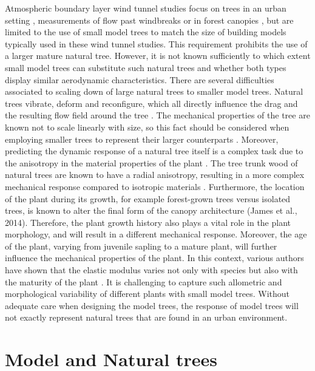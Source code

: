 Atmospheric boundary layer wind tunnel studies focus on trees in an urban setting \citep{Gromke2011,Gromke2008a}, measurements of flow past windbreaks \citep{Guan2003} or in forest canopies \citep{Bai2013,Conan2015,Kinnersley1994}, but are limited to the use of small model trees to match the size of building models typically used in these wind tunnel studies. This requirement prohibits the use of a larger mature natural tree. However, it is not known sufficiently to which extent small model trees can substitute such natural trees and whether both types display similar aerodynamic characteristics. There are several difficulties associated to scaling down of large natural trees to smaller model trees. Natural trees vibrate, deform and reconfigure, which all directly influence the drag and the resulting flow field around the tree \citep{Schouveiler2006,Tadrist2014,Vogel1989}. The mechanical properties of the tree are known not to scale linearly with size, so this fact should be considered when employing smaller trees to represent their larger counterparts \citep{DeLangre2008}. Moreover, predicting the dynamic response of a natural tree itself is a complex task due to the anisotropy in the material properties of the plant \citep{James2017}. The tree trunk wood of natural trees are known to have a radial anisotropy, resulting in a more complex mechanical response compared to isotropic materials \citep{Albrecht2016}. Furthermore, the location of the plant during its growth, for example forest-grown trees versus isolated trees, is known to alter the final form of the canopy architecture (James et al., 2014). Therefore, the plant growth history also plays a vital role in the plant morphology, and will result in a different mechanical response. Moreover, the age of the plant, varying from juvenile sapling to a mature plant, will further influence the mechanical properties of the plant. In this context, various authors have shown that the elastic modulus varies not only with species but also with the maturity of the plant \citep{Dahle2010,Macdonald2002,Telewski1995,Watt2008,Woodrum2003}. It is challenging to capture such allometric and morphological variability of different plants with small model trees. Without adequate care when designing the model trees, the response of model trees will not exactly represent natural trees that are found in an urban environment.

\section{Model and Natural trees}

